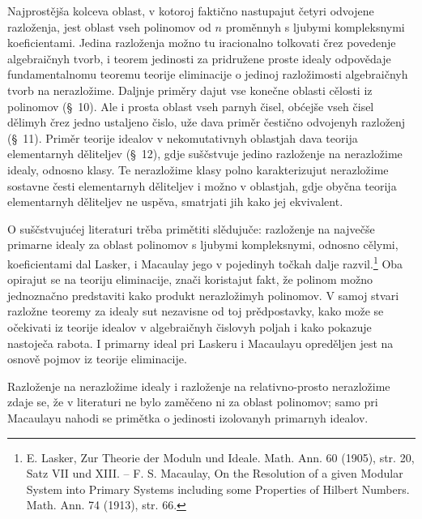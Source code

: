 \documentclass[11pt]{article}
\begin{document}
Najprostějša kolceva oblast, v kotoroj faktično nastupajut četyri odvojene razloženja, jest oblast vseh polinomov od \(n\) proměnnyh s ljubymi kompleksnymi koeficientami. Jedina razloženja možno tu iracionalno tolkovati črez povedenje algebraičnyh tvorb, i teorem jedinosti za pridružene proste idealy odpovědaje fundamentalnomu teoremu teorije eliminacije o jedinoj razložimosti algebraičnyh tvorb na nerazložime. Daljnje priměry dajut vse konečne oblasti cělosti iz polinomov (\S~10). Ale i prosta oblast vseh parnyh čisel, obćejše vseh čisel dělimyh črez jedno ustaljeno čislo, uže dava priměr čestično odvojenyh razloženj (\S~11). Priměr teorije idealov v nekomutativnyh oblastjah dava teorija elementarnyh děliteljev (\S~12), gdje suščstvuje jedino razloženje na nerazložime idealy, odnosno klasy. Te nerazložime klasy polno karakterizujut nerazložime sostavne česti elementarnyh děliteljev i možno v oblastjah, gdje obyčna teorija elementarnyh děliteljev ne uspěva, smatrjati jih kako jej ekvivalent.

O suščstvujućej literaturi trěba primětiti slědujuče: razloženje na največše primarne idealy za oblast polinomov s ljubymi kompleksnymi, odnosno cělymi, koeficientami dal Lasker, i Macaulay jego v pojedinyh točkah dalje razvil.\footnote{E. Lasker, Zur Theorie der Moduln und Ideale. Math. Ann. 60 (1905), str. 20, Satz VII und XIII. -- F. S. Macaulay, On the Resolution of a given Modular System into Primary Systems including some Properties of Hilbert Numbers. Math. Ann. 74 (1913), str. 66.} Oba opirajut se na teoriju eliminacije, znači koristajut fakt, že polinom možno jednoznačno predstaviti kako produkt nerazložimyh polinomov. V samoj stvari razložne teoremy za idealy sut nezavisne od toj prědpostavky, kako može se očekivati iz teorije idealov v algebraičnyh čislovyh poljah i kako pokazuje nastoječa rabota. I primarny ideal pri Laskeru i Macaulayu opreděljen jest na osnově pojmov iz teorije eliminacije.

Razloženje na nerazložime idealy i razloženje na relativno-prosto nerazložime zdaje se, že v literaturi ne bylo zaměčeno ni za oblast polinomov; samo pri Macaulayu nahodi se primětka o jedinosti izolovanyh primarnyh idealov.
\end{document}
